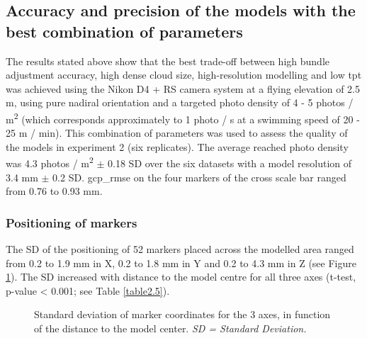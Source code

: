 \subsection{Accuracy and precision of the models with the best combination of parameters}\label{chapitre2_3.2}
The results stated above show that the best trade-off between high bundle adjustment accuracy, high dense cloud size, high-resolution modelling and low \acrshort{tpt} was achieved using the Nikon D4 + RS camera system at a flying elevation of 2.5 m, using pure nadiral orientation and a targeted photo density of 4 - 5 photos / m\textsuperscript{2} (which corresponds approximately to 1 photo / s at a swimming speed of 20 - 25 m / min). This combination of parameters was used to assess the quality of the models in experiment 2 (six replicates). The average reached photo density was 4.3 photos / m\textsuperscript{2} $\pm$ 0.18 SD over the six datasets with a model resolution of 3.4 mm $\pm$ 0.2 SD. \acrshort{gcp_rmse} on the four markers of the cross scale bar ranged from 0.76 to 0.93 mm.

\subsubsection{Positioning of markers}\label{chapitre2_3.2.1}
The SD of the positioning of 52 markers placed across the modelled area ranged from 0.2 to 1.9 mm in X, 0.2 to 1.8 mm in Y and 0.2 to 4.3 mm in Z (see Figure \ref{figure2.5}). The SD increased with distance to the model centre for all three axes (t-test, p-value < 0.001; see Table \ref{table2.5}).

\begin{figure}[htbp]
	\caption[Standard deviation of marker coordinates for the 3 axes]{Standard deviation of marker coordinates for the 3 axes, in function of the distance to the model center. \textit{SD = Standard Deviation.}}
	\label{figure2.5}
\end{figure}



